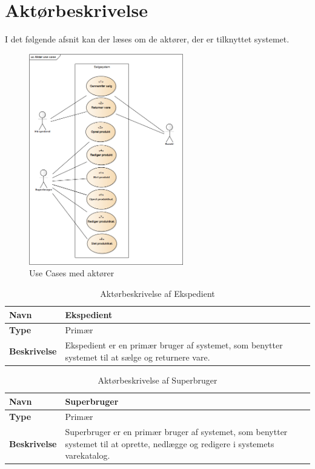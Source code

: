 \section{Aktørbeskrivelse}

I det følgende afsnit kan der læses om de aktører, der er tilknyttet systemet. \\

\begin{figure}[H]
	\centering
	\includegraphics[width=0.6\textwidth]{Krav/Images/AktorUC}
	\caption{Use Cases med aktører}
	\label{fig:ActorUC}
\end{figure}

\begin{table}[H]
	\label{EKS}
	\begin{tabularx}{\textwidth}{|l|X|}
		\hline
		\textbf{Navn} & Ekspedient \\
		\hline
		\textbf{Type} & Primær \\
		\hline
		\textbf{Beskrivelse} & Ekspedient er en primær bruger af systemet, som benytter systemet til at sælge og returnere vare. \\
		\hline
	\end{tabularx}
	\captionsetup{justification=raggedright,singlelinecheck=false}
	\caption{Aktørbeskrivelse af Ekspedient}
	\label{tab:AktEks}
\end{table}


\begin{table}[H]
	\begin{tabularx}{\textwidth}{|l|X|}
		\hline
		\textbf{Navn} & Superbruger \\
		\hline
		\textbf{Type} & Primær \\
		\hline
		\textbf{Beskrivelse} & Superbruger er en primær bruger af systemet, som benytter systemet til at oprette, nedlægge og redigere i systemets varekatalog. \\
		\hline
	\end{tabularx}
	\captionsetup{justification=raggedright,singlelinecheck=false}
	\caption{Aktørbeskrivelse af Superbruger}
	\label{tab:AktSuu}
\end{table}

